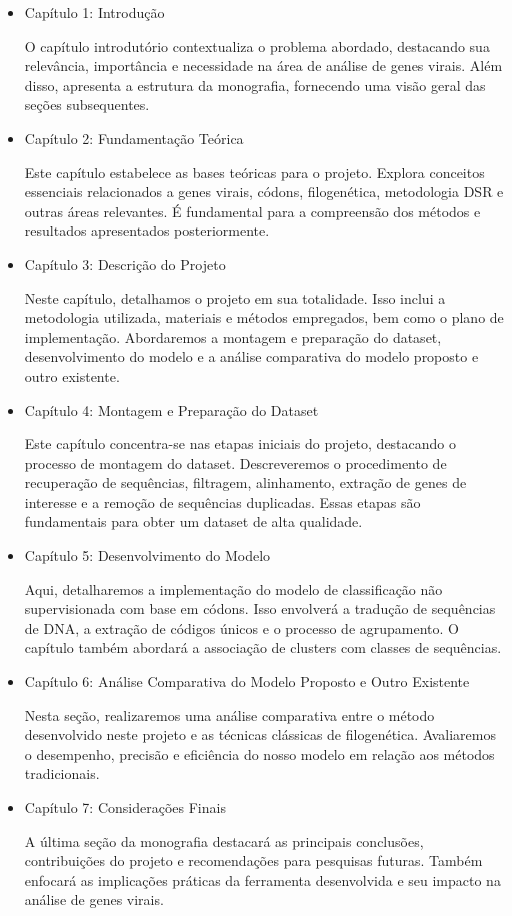\begin{itemize}
      \item Capítulo 1: Introdução

            O capítulo introdutório contextualiza o problema abordado, destacando sua relevância, importância e necessidade na área de análise de genes virais. Além disso, apresenta a estrutura da monografia, fornecendo uma visão geral das seções subsequentes.

      \item Capítulo 2: Fundamentação Teórica

            Este capítulo estabelece as bases teóricas para o projeto. Explora conceitos essenciais relacionados a genes virais, códons, filogenética, metodologia DSR e outras áreas relevantes. É fundamental para a compreensão dos métodos e resultados apresentados posteriormente.

      \item Capítulo 3: Descrição do Projeto

            Neste capítulo, detalhamos o projeto em sua totalidade. Isso inclui a metodologia utilizada, materiais e métodos empregados, bem como o plano de implementação. Abordaremos a montagem e preparação do dataset, desenvolvimento do modelo e a análise comparativa do modelo proposto e outro existente.

      \item Capítulo 4: Montagem e Preparação do Dataset

            Este capítulo concentra-se nas etapas iniciais do projeto, destacando o processo de montagem do dataset. Descreveremos o procedimento de recuperação de sequências, filtragem, alinhamento, extração de genes de interesse e a remoção de sequências duplicadas. Essas etapas são fundamentais para obter um dataset de alta qualidade.

      \item Capítulo 5: Desenvolvimento do Modelo

            Aqui, detalharemos a implementação do modelo de classificação não supervisionada com base em códons. Isso envolverá a tradução de sequências de DNA, a extração de códigos únicos e o processo de agrupamento. O capítulo também abordará a associação de clusters com classes de sequências.

      \item Capítulo 6: Análise Comparativa do Modelo Proposto e Outro Existente

            Nesta seção, realizaremos uma análise comparativa entre o método desenvolvido neste projeto e as técnicas clássicas de filogenética. Avaliaremos o desempenho, precisão e eficiência do nosso modelo em relação aos métodos tradicionais.

      \item Capítulo 7: Considerações Finais

            A última seção da monografia destacará as principais conclusões, contribuições do projeto e recomendações para pesquisas futuras. Também enfocará as implicações práticas da ferramenta desenvolvida e seu impacto na análise de genes virais.
\end{itemize}

